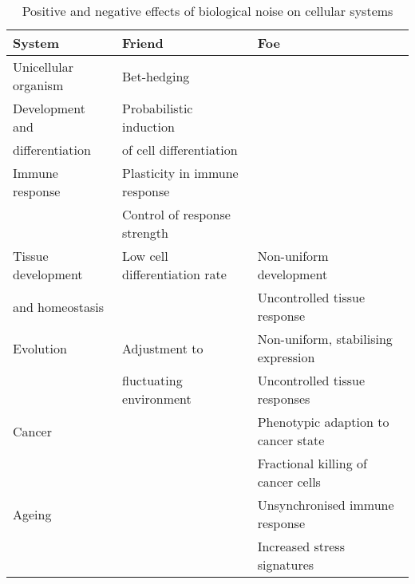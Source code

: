\begin{table}[hb	]
\centering
\caption{Positive and negative effects of biological noise on cellular systems}
\label{table:effects_noise}
\begin{tabular}{l l l}
\toprule
\toprule
\textbf{System} & \textbf{Friend} & \textbf{Foe} \\ 
\midrule
\midrule
Unicellular organism & Bet-hedging & \\
\midrule
Development and & Probabilistic induction  & \\
differentiation & of cell differentiation & \\
\midrule
Immune response & Plasticity in immune response & \\
 & Control of response strength &   \\
\midrule
Tissue development  & Low cell differentiation rate & Non-uniform development \\ 
and homeostasis &  & Uncontrolled tissue response \\
\midrule
Evolution & Adjustment to  & Non-uniform, stabilising expression \\ 
& fluctuating environment & Uncontrolled tissue responses \\
\midrule
Cancer &  & Phenotypic adaption to cancer state \\
& & Fractional killing of cancer cells \\
\midrule
Ageing &  & Unsynchronised immune response \\
& & Increased stress signatures \\ 
\bottomrule
\bottomrule
\end{tabular}
\end{table}

